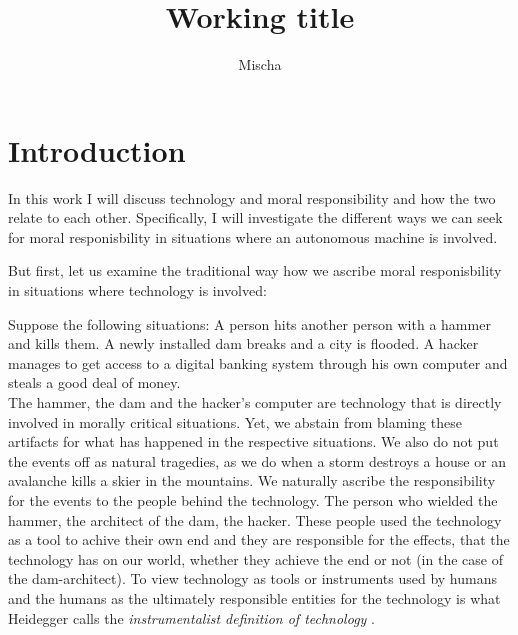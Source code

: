 \documentclass{article}
\title{Working title}
\author{Mischa}
\begin{document}
\begin{titlepage}
	\maketitle
\end{titlepage}
\tableofcontents

\section{Introduction}

In this work I will discuss technology and moral responsibility and how the two
relate to each other. Specifically, I will investigate the different ways we can seek
for moral responisbility in situations where an autonomous machine is involved.

But first, let us examine the traditional way how we ascribe moral
responisbility in situations where technology is involved:

Suppose the following situations: A person hits another person with a hammer and
kills them. A newly installed dam breaks and a city is flooded. A hacker manages
to get access to a digital banking system through his own computer and steals a good deal of money.\\

The hammer, the dam and the hacker's computer are technology that is directly
involved in morally critical situations. Yet, we abstain from blaming these
artifacts for what has happened in the respective situations. We also do not put
the events off as natural tragedies, as we do when a storm destroys a house or
an avalanche kills a skier in the mountains. We naturally ascribe the
responsibility for the events to the people behind the technology.
The person who wielded the hammer, the architect of the dam, the hacker.
These people used the technology as a tool to achive their own end and they are
responsible for the effects, that the technology has on our world, whether they
achieve the end or not (in the case of the dam-architect).
To view technology as tools or instruments used by humans and the humans as the ultimately
responsible entities for the technology is what Heidegger calls the \textit{instrumentalist
definition of technology} \cite{heidegger1977technology}. 

\cite[p.4]{heidegger1977technology}
\end{document}
